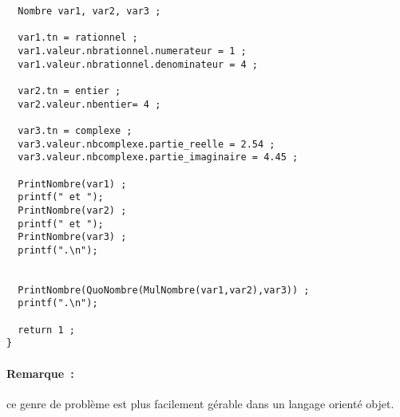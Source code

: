 \begin{exercice}
\begin{verbatim}
  Nombre var1, var2, var3 ;

  var1.tn = rationnel ;
  var1.valeur.nbrationnel.numerateur = 1 ;
  var1.valeur.nbrationnel.denominateur = 4 ;

  var2.tn = entier ;
  var2.valeur.nbentier= 4 ;

  var3.tn = complexe ;
  var3.valeur.nbcomplexe.partie_reelle = 2.54 ;
  var3.valeur.nbcomplexe.partie_imaginaire = 4.45 ;

  PrintNombre(var1) ;
  printf(" et ");
  PrintNombre(var2) ;
  printf(" et ");
  PrintNombre(var3) ;
  printf(".\n");


  PrintNombre(QuoNombre(MulNombre(var1,var2),var3)) ;
  printf(".\n");

  return 1 ;
}
\end{verbatim}
\ifcorrection
\begin{correction}

\end{correction}
\fi 
\paragraph{Remarque~:} ce genre de  probl\`eme est plus facilement
g\'erable     dans un    langage   orient\'e  objet.    
\end{exercice}

